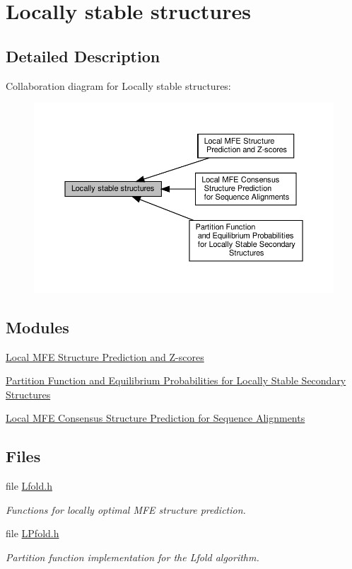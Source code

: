 \hypertarget{group__local__fold}{}\section{Locally stable structures}
\label{group__local__fold}


\subsection{Detailed Description}
Collaboration diagram for Locally stable structures\+:
\nopagebreak
\begin{figure}[H]
\begin{center}
\leavevmode
\includegraphics[width=350pt]{group__local__fold}
\end{center}
\end{figure}
\subsection*{Modules}
\begin{DoxyCompactItemize}
\item 
\hyperlink{group__local__mfe__fold}{Local M\+F\+E Structure Prediction and Z-\/scores}
\item 
\hyperlink{group__local__pf__fold}{Partition Function and Equilibrium Probabilities for Locally Stable Secondary Structures}
\item 
\hyperlink{group__local__consensus__fold}{Local M\+F\+E Consensus Structure Prediction for Sequence Alignments}
\end{DoxyCompactItemize}
\subsection*{Files}
\begin{DoxyCompactItemize}
\item 
file \hyperlink{Lfold_8h}{Lfold.\+h}
\begin{DoxyCompactList}\small\item\em Functions for locally optimal M\+FE structure prediction. \end{DoxyCompactList}\item 
file \hyperlink{LPfold_8h}{L\+Pfold.\+h}
\begin{DoxyCompactList}\small\item\em Partition function implementation for the Lfold algorithm. \end{DoxyCompactList}\end{DoxyCompactItemize}
